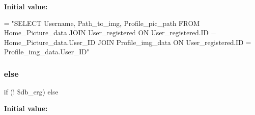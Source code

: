 {\bfseries Initial value\+:}
\begin{DoxyCode}
= \textcolor{stringliteral}{"SELECT Username, Path\_to\_img, Profile\_pic\_path FROM Home\_Picture\_data }
\textcolor{stringliteral}{              JOIN User\_registered ON User\_registered.ID = Home\_Picture\_data.User\_ID }
\textcolor{stringliteral}{              JOIN Profile\_img\_data ON User\_registered.ID = Profile\_img\_data.User\_ID"}
\end{DoxyCode}
\mbox{\label{home_8php_a9d97d44073c509a9974d6568b099b7e2}} 
\subsubsection{\texorpdfstring{else}{else}}
{\footnotesize\ttfamily if (! \$db\+\_\+erg) else}

{\bfseries Initial value\+:}
